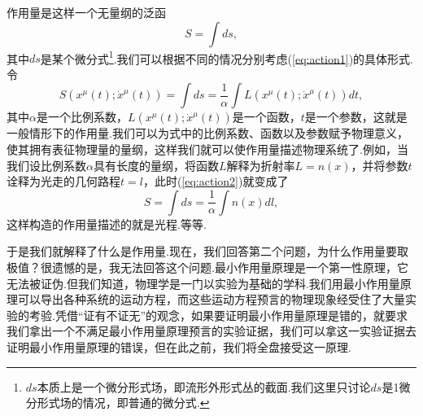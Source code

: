 		作用量是这样一个无量纲的泛函
		\begin{equation}\label{eq:action1}
			S=\int ds,
		\end{equation}
		其中$ds$是某个微分式\footnote{$ds$本质上是一个微分形式场，即流形外形式丛的截面.我们这里只讨论$ds$是1微分形式场的情况，即普通的微分式.}.我们可以根据不同的情况分别考虑(\ref{eq:action1})的具体形式.令
		\begin{equation}\label{eq:action2}
			S(x^\mu(t);\dot{x}^\mu(t))=\int ds=\frac{1}{\alpha}\int L(x^\mu(t);\dot{x}^\mu(t))dt,
		\end{equation}
		其中$\alpha$是一个比例系数，$L(x^\mu(t);\dot{x}^\mu(t))$是一个函数，$t$是一个参数，这就是一般情形下的作用量.我们可以为式中的比例系数、函数以及参数赋予物理意义，使其拥有表征物理量的量纲，这样我们就可以使作用量描述物理系统了.例如，当我们设比例系数$\alpha$具有长度的量纲，将函数$L$解释为折射率$L=n(x)$，并将参数$t$诠释为光走的几何路程$t=l$，此时(\ref{eq:action2})就变成了
		$$S=\int ds=\frac{1}{\alpha}\int n(x)dl,$$
		这样构造的作用量描述的就是光程.等等.

		于是我们就解释了什么是作用量.现在，我们回答第二个问题，为什么作用量要取极值？很遗憾的是，我无法回答这个问题.最小作用量原理是一个第一性原理，它无法被证伪.但我们知道，物理学是一门以实验为基础的学科.我们用最小作用量原理可以导出各种系统的运动方程，而这些运动方程预言的物理现象经受住了大量实验的考验.凭借“证有不证无”的观念，如果要证明最小作用量原理是错的，就要求我们拿出一个不满足最小作用量原理预言的实验证据，我们可以拿这一实验证据去证明最小作用量原理的错误，但在此之前，我们将全盘接受这一原理.

